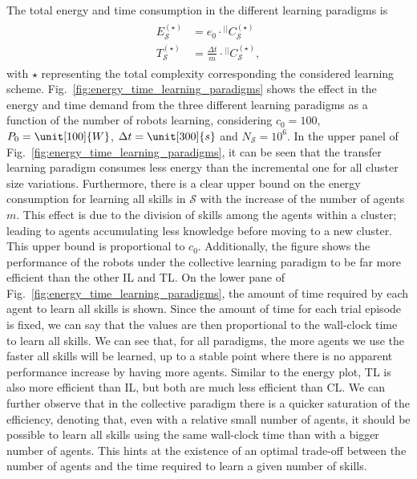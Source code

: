The total energy and time consumption in the different learning paradigms is
\begin{align}
\begin{split}
	E^{(\star)}_{\mathcal{S}} &= e_{0} \cdot {}^{\lvert \lvert}C_\mathcal{S}^{(\star)}\\
	T^{(\star)}_{\mathcal{S}} &= \frac{\Delta t}{m} \cdot {}^{\lvert \lvert}C_\mathcal{S}^{(\star)},
\end{split}
\end{align}
with $ \star $ representing the total complexity corresponding the considered learning scheme. Fig.~\ref{fig:energy_time_learning_paradigms} shows the effect in the energy and time demand from the three different learning paradigms as a function of the number of robots learning, considering $c_0 = 100$, $P_0  = \unit[100]{W}$, $ \Delta t = \unit[300]{s}$ and $ N_\mathcal{S} = 10^6 $. In the upper panel of Fig.~\ref{fig:energy_time_learning_paradigms}, it can be seen that the transfer learning paradigm consumes less energy than the incremental one for all cluster size variations. Furthermore, there is a clear upper bound on the energy consumption for learning all skills in $\mathcal{S}$ with the increase of the number of agents $m$. This effect is due to the division of skills among the agents within a cluster; leading to agents accumulating less knowledge before moving to a new cluster. This upper bound is proportional to $c_0$. Additionally, the figure shows the performance of the robots under the collective learning paradigm to be far more efficient than the other IL and TL. On the lower pane  of Fig.~\ref{fig:energy_time_learning_paradigms}, the amount of time required by each agent to learn all skills is shown. Since the amount of time for each trial episode is fixed, we can say that the values are then proportional to the wall-clock time to learn all skills. We can see that, for all paradigms, the more agents we use the faster all skills will be learned, up to a stable point where there is no apparent performance increase by having more agents. Similar to the energy plot, TL is also more efficient than IL, but both are much less efficient than CL. We can further observe that in the collective paradigm there is a quicker saturation of the efficiency, denoting that, even with a relative small number of agents, it should be possible to learn all skills using the same wall-clock time than with a bigger number of agents. This hints at the existence of an optimal trade-off between the number of agents and the time required to learn a given number of skills.
